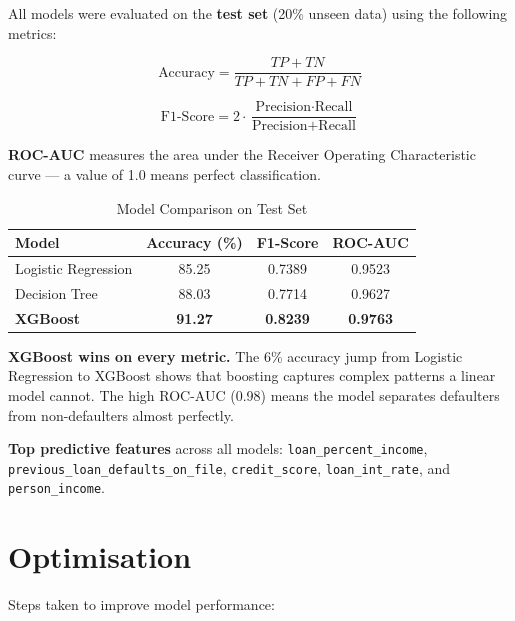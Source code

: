 \documentclass[12pt, a4paper]{article}
\begin{document}
All models were evaluated on the \textbf{test set} (20\% unseen data) using the following metrics:

\begin{equation}
\text{Accuracy} = \frac{TP + TN}{TP + TN + FP + FN}
\end{equation}

\begin{equation}
\text{F1-Score} = 2 \cdot \frac{\text{Precision} \cdot \text{Recall}}{\text{Precision} + \text{Recall}}
\end{equation}

\textbf{ROC-AUC} measures the area under the Receiver Operating Characteristic curve --- a value of 1.0 means perfect classification.

\begin{table}[H]
  \centering
  \caption{Model Comparison on Test Set}
  \label{tab:results}
  \renewcommand{\arraystretch}{1.5}
  \begin{tabular}{l c c c}
    \toprule
    \rowcolor{blue!20} \textbf{Model} & \textbf{Accuracy (\%)} & \textbf{F1-Score} & \textbf{ROC-AUC} \\
    \midrule
    Logistic Regression & 85.25 & 0.7389 & 0.9523 \\
    \rowcolor{gray!10} Decision Tree       & 88.03 & 0.7714 & 0.9627 \\
    \rowcolor{green!20} \textbf{XGBoost}    & \textbf{91.27} & \textbf{0.8239} & \textbf{0.9763} \\
    \bottomrule
  \end{tabular}
\end{table}

\textbf{XGBoost wins on every metric.} The 6\% accuracy jump from Logistic Regression to XGBoost shows that boosting captures complex patterns a linear model cannot. The high ROC-AUC (0.98) means the model separates defaulters from non-defaulters almost perfectly.

\textbf{Top predictive features} across all models: \texttt{loan\_percent\_income}, \texttt{previous\_loan\_defaults\_on\_file}, \texttt{credit\_score}, \texttt{loan\_int\_rate}, and \texttt{person\_income}.

\section{Optimisation}

Steps taken to improve model performance:
\end{document}
